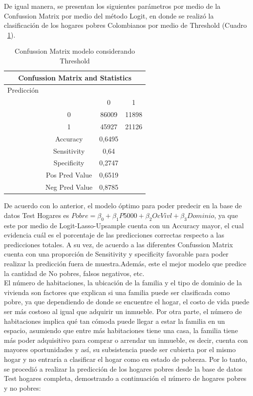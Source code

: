 \documentclass[conference, 10pt]{IEEEtran}
\begin{document}
De igual manera, se presentan los siguientes parámetros por medio de la Confussion Matrix por medio del método Logit, en donde se realizó la clasificación de los hogares pobres Colombianos por medio de Threshold (Cuadro ~\ref{tab_10}).



\begin{table}[htbp]
\caption{Confussion Matrix modelo considerando Threshold }
\begin{center}
\begin{tabular}{|c c c c|}
\hline
\multicolumn{4}{|c|}{\textbf{Confussion Matrix and Statistics}} \\
\cline{1-4} 
\hline
 Predicción&& &\\
 & &0&1\\
 &0&86009&11898\\
  &1&45927&21126\\
	\hline
&{Accuracy}&0,6495& \\
	&{Sensitivity} &0,64& \\
&{Specificity} &0,2747& \\
&{Pos Pred Value}&0,6519& \\
& {Neg Pred Value} &0,8785& \\
\hline
\end{tabular}
\label{tab_10}
\end{center}
\end{table}

De acuerdo con lo anterior, el modelo óptimo para poder predecir en la base de datos Test Hogares es  $Pobre = \beta_0+\beta_{1}P5000 +\beta_{2}OcVivl+\beta_{3}Dominio$, ya que este por medio de Logit-Lasso-Upsample cuenta con un Accuracy mayor, el cual evidencia cuál es el porcentaje de las predicciones correctas respecto a las predicciones totales.  A su vez, de acuerdo a las diferentes Confussion Matrix cuenta con una proporción de Sensitivity y specificity favorable para poder realizar la predicción fuera de muestra.Además, este el mejor modelo que predice la cantidad de No pobres, falsos negativos, etc. \\
El número de habitaciones, la ubicación de la familia y el tipo de dominio de la vivienda son factores que explican si una familia puede ser clasificada como pobre, ya que dependiendo de donde se encuentre el hogar, el costo de vida puede ser más costoso al igual que adquirir un inmueble. Por otra parte, el número de habitaciones implica qué tan cómoda puede llegar a estar la familia en un espacio, asumiendo que entre más habitaciones tiene una casa, la familia tiene más poder adquisitivo para comprar o arrendar un inmueble, es decir, cuenta con mayores oportunidades y así, su subsistencia puede ser cubierta por el mismo hogar y no entraría a clasificar el hogar como en estado de pobreza. Por lo tanto, se procedió a realizar la predicción de los hogares pobres desde la base de datos Test hogares completa, demostrando a continuación el número de hogares pobres y no pobres:
\end{document}
